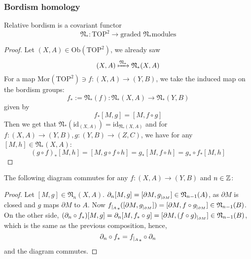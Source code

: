 \documentclass[a4paper,11pt]{article}
\begin{document}
\subsubsection{Bordism homology}

\begin{lemma}\cite[II, Satz 3.2]{brocker}\label{functoriality}
    Relative bordism is a covariant functor \[\mathfrak{N}_\ast:\mathrm{TOP}^2\to\text{graded \(\mathfrak{N}_\ast\)modules}\]
\end{lemma}

\begin{proof}\cite{brocker} 
    Let \((X,A)\in\mathrm{Ob}(\mathrm{TOP}^2)\), we already saw
    \[(X,A)\xmapsto{\mathfrak{N}_\ast}\mathfrak{N}_\ast(X,A)\]
    For a map \(\mathrm{Mor}(\mathrm{TOP}^2)\ni f:(X,A)\to(Y,B)\), we take the induced map on the bordism groups:
    \[f_\ast:=\mathfrak{N}_\ast(f):\mathfrak{N}_\ast(X,A)\to\mathfrak{N}_\ast(Y,B)\]
    given by 
    \[f_\ast[M,g] = [M,f\circ g]\]
    Then we get that \(\mathfrak{N}_\ast(\mathrm{id}_{(X,A)})=\mathrm{id}_{\mathfrak{N}_\ast(X,A)}\) and for \(f:(X,A)\to(Y,B), g:(Y,B)\to(Z,C)\), we have for any \([M,h]\in\mathfrak{N}_\ast(X,A)\):
    \[{(g\circ f)}_{\ast}[M,h]=[M,g\circ f\circ h]=g_\ast[M,f\circ h]=g_\ast\circ f_\ast[M,h]\]
\end{proof}

\begin{lemma}
    The following diagram commutes for any \(f:(X,A)\to(Y,B)\) and \(n\in\mathbb{Z}\): %
    \begin{center}
    \end{center}
\end{lemma}

\begin{proof}
    Let \([M,g]\in\mathfrak{N}_n(X,A)\). \(\partial_n[M,g]=[\partial M, g_{|_{\partial M}}]\in\mathfrak{N}_{n-1}(A)\), as \(\partial M\) is closed and \(g\) maps \(\partial M\) to \(A\). %
    Now \({f_{|_{A}}}_\ast([\partial M,g_{|_{\partial M}}])=[\partial M,f\circ g_{|_{\partial M}}]\in \mathfrak{N}_{n-1}(B)\).\\
    On the other side, \((\partial_n\circ f_\ast)[M,g]=\partial_n [M,f_\ast\circ g]=[\partial M,(f\circ g)_{|_{\partial M}}]\in \mathfrak{N}_{n-1}(B)\), which is the same as the previous composition, hence,
    \[\partial_n\circ f_\ast={f_{|_{A}}}_\ast\circ \partial_n\]
    and the diagram commutes.
\end{proof}
\end{document}
